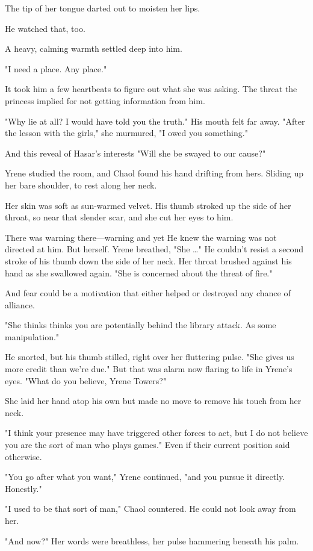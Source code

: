 The tip of her tongue darted out to moisten her lips.

He watched that, too.

A heavy, calming warmth settled deep into him.

"I need a place. Any place."

It took him a few heartbeats to figure out what she was asking. The threat the princess implied for not getting information from him.

"Why lie at all? I would have told you the truth." His mouth felt far away. "After the lesson with the girls," she murmured, "I owed you something."

And this reveal of Hasar's interests  "Will she be swayed to our cause?"

Yrene studied the room, and Chaol found his hand drifting from hers. Sliding up her bare shoulder, to rest along her neck.

Her skin was soft as sun-warmed velvet. His thumb stroked up the side of her throat, so near that slender scar, and she cut her eyes to him.

There was warning there---warning and yet  He knew the warning was not directed at him. But herself. Yrene breathed, "She \ldots" He couldn't resist a second stroke of his thumb down the side of her neck. Her throat brushed against his hand as she swallowed again. "She is concerned about the threat of fire."

And fear could be a motivation that either helped or destroyed any chance of alliance.

"She thinks  thinks you are potentially behind the library attack. As some manipulation."

He snorted, but his thumb stilled, right over her fluttering pulse. "She gives us more credit than we're due." But that was alarm now flaring to life in Yrene's eyes. "What do you believe, Yrene Towers?"

She laid her hand atop his own but made no move to remove his touch from her neck.

"I think your presence may have triggered other forces to act, but I do not believe you are the sort of man who plays games." Even if their current position said otherwise.

"You go after what you want," Yrene continued, "and you pursue it directly. Honestly."

"I used to be that sort of man," Chaol countered. He could not look away from her.

"And now?" Her words were breathless, her pulse hammering beneath his palm.


